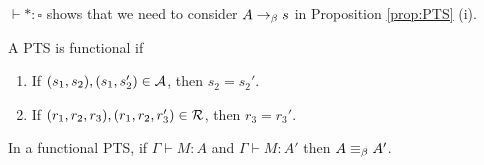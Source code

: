 \begin{rem}
    $\vdash * : \square$ shows that we need to consider $A \to_{\beta} s$ in Proposition \ref{prop:PTS} (i).
\end{rem}

\begin{boxdefi}
    A PTS is \alert{functional} if 
    \begin{enumerate}
        \item If $(s_1, s_2), (s_1, s_2') \in \mathcal{A}$, then $s_2 =s_2'$.
        \item If $(r_1, r_2, r_3), (r_1, r_2, r_3') \in \mathcal{R}$, then $r_3 = r_3'$.
    \end{enumerate}
\end{boxdefi}

\begin{boxthm}
    In a functional PTS, if $\Gamma \vdash M : A$ and $\Gamma \vdash M : A'$ then $A \equiv_{\beta} A'$.
\end{boxthm}